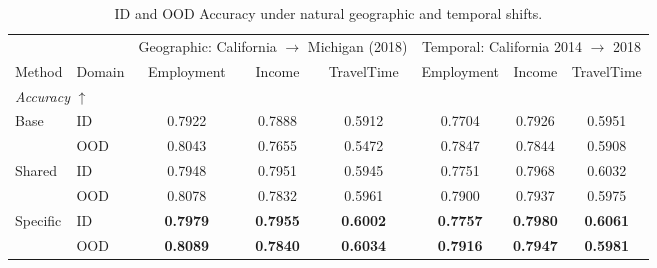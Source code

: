 
\begin{table}[H]
  \centering
  \caption{ID and OOD Accuracy under natural geographic and temporal shifts.}
  \label{tab:natural-shifts}
  \small
  \setlength{\tabcolsep}{4.4pt}
  \renewcommand{\arraystretch}{1.02}
  \begin{tabular}{llcccccc}
    \toprule
    & & \multicolumn{3}{c}{Geographic: California $\rightarrow$ Michigan (2018)}
      & \multicolumn{3}{c}{Temporal: California 2014 $\rightarrow$ 2018} \\
    \cmidrule(lr){3-5}\cmidrule(lr){6-8}
    Method & Domain & Employment & Income & TravelTime
      & Employment & Income & TravelTime \\
    \midrule
    \multicolumn{8}{l}{\textit{Accuracy} $\uparrow$} \\
    Base & ID
      & 0.7922 & 0.7888 & 0.5912 & 0.7704 & 0.7926 & 0.5951 \\
         & OOD
      & 0.8043 & 0.7655 & 0.5472 & 0.7847 & 0.7844 & 0.5908 \\
    Shared & ID
      & \textcolor{sharedblue}{0.7948} & \textcolor{sharedblue}{0.7951} & \textcolor{sharedblue}{0.5945}
      & \textcolor{sharedblue}{0.7751} & \textcolor{sharedblue}{0.7968} & \textcolor{sharedblue}{0.6032} \\
         & OOD
      & \textcolor{sharedblue}{0.8078} & \textcolor{sharedblue}{0.7832} & \textcolor{sharedblue}{0.5961}
      & \textcolor{sharedblue}{0.7900} & \textcolor{sharedblue}{0.7937} & \textcolor{sharedblue}{0.5975} \\
    Specific & ID
      & \textcolor{specificred}{\textbf{0.7979}} & \textcolor{specificred}{\textbf{0.7955}} & \textcolor{specificred}{\textbf{0.6002}}
      & \textcolor{specificred}{\textbf{0.7757}} & \textcolor{specificred}{\textbf{0.7980}} & \textcolor{specificred}{\textbf{0.6061}} \\
         & OOD
      & \textcolor{specificred}{\textbf{0.8089}} & \textcolor{specificred}{\textbf{0.7840}} & \textcolor{specificred}{\textbf{0.6034}}
      & \textcolor{specificred}{\textbf{0.7916}} & \textcolor{specificred}{\textbf{0.7947}} & \textcolor{specificred}{\textbf{0.5981}} \\
    \bottomrule
  \end{tabular}
\end{table}
